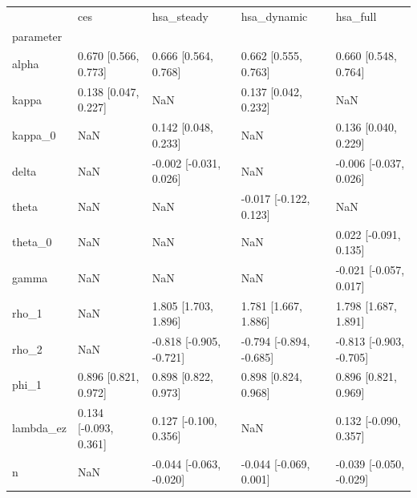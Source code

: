 \begin{tabular}{lllll}
\toprule
 & ces & hsa\_steady & hsa\_dynamic & hsa\_full \\
parameter &  &  &  &  \\
\midrule
alpha & 0.670 [0.566, 0.773] & 0.666 [0.564, 0.768] & 0.662 [0.555, 0.763] & 0.660 [0.548, 0.764] \\
kappa & 0.138 [0.047, 0.227] & NaN & 0.137 [0.042, 0.232] & NaN \\
kappa\_0 & NaN & 0.142 [0.048, 0.233] & NaN & 0.136 [0.040, 0.229] \\
delta & NaN & -0.002 [-0.031, 0.026] & NaN & -0.006 [-0.037, 0.026] \\
theta & NaN & NaN & -0.017 [-0.122, 0.123] & NaN \\
theta\_0 & NaN & NaN & NaN & 0.022 [-0.091, 0.135] \\
gamma & NaN & NaN & NaN & -0.021 [-0.057, 0.017] \\
rho\_1 & NaN & 1.805 [1.703, 1.896] & 1.781 [1.667, 1.886] & 1.798 [1.687, 1.891] \\
rho\_2 & NaN & -0.818 [-0.905, -0.721] & -0.794 [-0.894, -0.685] & -0.813 [-0.903, -0.705] \\
phi\_1 & 0.896 [0.821, 0.972] & 0.898 [0.822, 0.973] & 0.898 [0.824, 0.968] & 0.896 [0.821, 0.969] \\
lambda\_ez & 0.134 [-0.093, 0.361] & 0.127 [-0.100, 0.356] & NaN & 0.132 [-0.090, 0.357] \\
n & NaN & -0.044 [-0.063, -0.020] & -0.044 [-0.069, 0.001] & -0.039 [-0.050, -0.029] \\
\bottomrule
\end{tabular}
